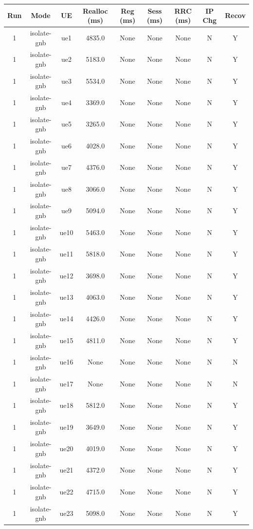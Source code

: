 \begin{table}[ht]
\centering
\begin{tabular}{|c|c|c|c|c|c|c|c|c|}
\hline
Run & Mode & UE & Realloc (ms) & Reg (ms) & Sess (ms) & RRC (ms) & IP Chg & Recov \\
\hline
1 & isolate-gnb & ue1 & 4835.0 & None & None & None & N & Y \\
1 & isolate-gnb & ue2 & 5183.0 & None & None & None & N & Y \\
1 & isolate-gnb & ue3 & 5534.0 & None & None & None & N & Y \\
1 & isolate-gnb & ue4 & 3369.0 & None & None & None & N & Y \\
1 & isolate-gnb & ue5 & 3265.0 & None & None & None & N & Y \\
1 & isolate-gnb & ue6 & 4028.0 & None & None & None & N & Y \\
1 & isolate-gnb & ue7 & 4376.0 & None & None & None & N & Y \\
1 & isolate-gnb & ue8 & 3066.0 & None & None & None & N & Y \\
1 & isolate-gnb & ue9 & 5094.0 & None & None & None & N & Y \\
1 & isolate-gnb & ue10 & 5463.0 & None & None & None & N & Y \\
1 & isolate-gnb & ue11 & 5818.0 & None & None & None & N & Y \\
1 & isolate-gnb & ue12 & 3698.0 & None & None & None & N & Y \\
1 & isolate-gnb & ue13 & 4063.0 & None & None & None & N & Y \\
1 & isolate-gnb & ue14 & 4426.0 & None & None & None & N & Y \\
1 & isolate-gnb & ue15 & 4811.0 & None & None & None & N & Y \\
1 & isolate-gnb & ue16 & None & None & None & None & N & N \\
1 & isolate-gnb & ue17 & None & None & None & None & N & N \\
1 & isolate-gnb & ue18 & 5812.0 & None & None & None & N & Y \\
1 & isolate-gnb & ue19 & 3649.0 & None & None & None & N & Y \\
1 & isolate-gnb & ue20 & 4019.0 & None & None & None & N & Y \\
1 & isolate-gnb & ue21 & 4372.0 & None & None & None & N & Y \\
1 & isolate-gnb & ue22 & 4715.0 & None & None & None & N & Y \\
1 & isolate-gnb & ue23 & 5098.0 & None & None & None & N & Y \\

\end{tabular}
\end{table}
